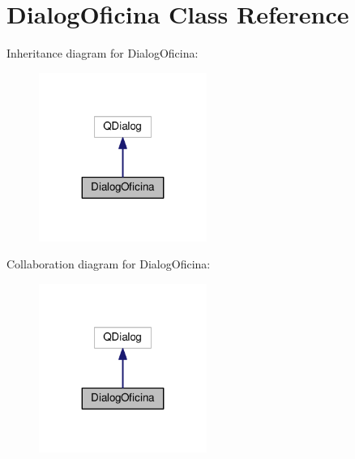 \hypertarget{classDialogOficina}{}\section{Dialog\+Oficina Class Reference}
\label{classDialogOficina}


Inheritance diagram for Dialog\+Oficina\+:
\nopagebreak
\begin{figure}[H]
\begin{center}
\leavevmode
\includegraphics[width=155pt]{classDialogOficina__inherit__graph}
\end{center}
\end{figure}


Collaboration diagram for Dialog\+Oficina\+:
\nopagebreak
\begin{figure}[H]
\begin{center}
\leavevmode
\includegraphics[width=155pt]{classDialogOficina__coll__graph}
\end{center}
\end{figure}
